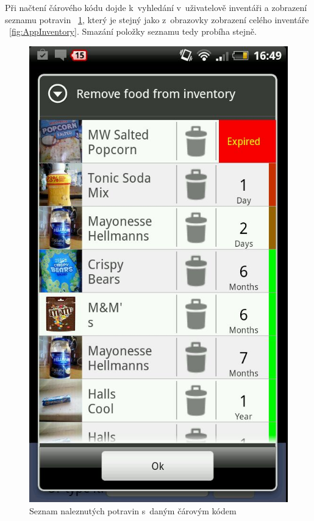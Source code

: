 \documentclass[thesis=B,czech]{FITthesis}[2013/10/20]
\begin{document}
Při načtení čárového kódu dojde k~vyhledání v~uživatelově inventáři a zobrazení seznamu potravin ~\ref{fig:AppScanRemoveList}, který je stejný jako z~obrazovky zobrazení celého inventáře ~\ref{fig:AppInventory}. Smazání položky seznamu tedy probíha stejně.

\begin{figure}[H]
  \centering
  \includegraphics[scale=0.4]{screenshots/app_scan_remove_list.jpg}
  \caption{Seznam naleznutých potravin s~daným čárovým kódem}
  \label{fig:AppScanRemoveList}
\end{figure}
\end{document}
